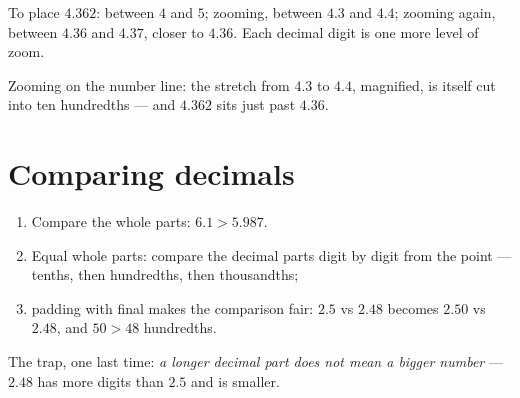 \begin{example}\label{ex:g5:decimals:line}
To place $4.362$: between $4$ and $5$; zooming, between $4.3$ and
$4.4$; zooming again, between $4.36$ and $4.37$, closer to $4.36$.
Each decimal digit is one more level of zoom.
\end{example}

\begin{omfigure}

{\small Zooming on the number line: the stretch from $4.3$ to $4.4$,
magnified, is itself cut into ten hundredths --- and $4.362$ sits
just past $4.36$.}
\end{omfigure}

\section{Comparing decimals}

\begin{method}\label{met:g5:decimals:compare}
\begin{enumerate}
  \item Compare the whole parts: $6.1 > 5.987$.
  \item Equal whole parts: compare the decimal parts digit by digit
        from the point --- tenths, then hundredths, then
        thousandths;
  \item padding with final  makes the comparison fair:
        $2.5$ vs $2.48$ becomes $2.50$ vs $2.48$, and $50 > 48$
        hundredths.
\end{enumerate}
The trap, one last time: \emph{a longer decimal part does not mean a
bigger number} --- $2.48$ has more digits than $2.5$ and is smaller.
\end{method}

